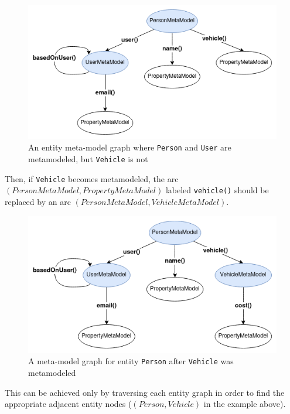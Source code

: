 \begin{enumerate}[label={\textbf{(\arabic*)*}}]
        \begin{figure}[H]\centering
            \includegraphics[scale=0.65]{images/meta-model-graph.drawio.png}
            \caption{An entity meta-model graph where \texttt{Person} and \texttt{User} are metamodeled, but \texttt{Vehicle} is not}\label{fig:meta-model_graph}
        \end{figure}

    Then, if \texttt{Vehicle} becomes metamodeled, the arc $(PersonMetaModel, PropertyMetaModel)$ labeled \texttt{vehicle()} should be replaced by an arc $(PersonMetaModel, VehicleMetaModel)$.

        \begin{figure}[H]\centering
            \includegraphics[scale=0.65]{images/meta-model-graph1.drawio.png}
            \caption{A meta-model graph for entity \texttt{Person} after \texttt{Vehicle} was metamodeled}\label{fig:meta-model_graph1}
        \end{figure}

    This can be achieved only by traversing each entity graph in order to find the appropriate adjacent entity nodes ($(Person, Vehicle)$ in the example above).
\end{enumerate}

